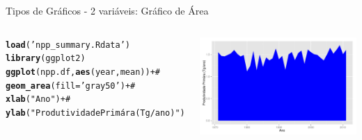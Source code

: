 \documentclass{beamer}\usepackage[]{graphicx}\usepackage[]{color}
\makeatletter
\newcommand{\hlstr}[1]{\textcolor[rgb]{0.192,0.494,0.8}{#1}}%
\newcommand{\hlcom}[1]{\textcolor[rgb]{0.678,0.584,0.686}{\textit{#1}}}%
\newcommand{\hlopt}[1]{\textcolor[rgb]{0,0,0}{#1}}%
\newcommand{\hlstd}[1]{\textcolor[rgb]{0.345,0.345,0.345}{#1}}%
\newcommand{\hlkwc}[1]{\textcolor[rgb]{0.333,0.667,0.333}{#1}}%
\newcommand{\hlkwd}[1]{\textcolor[rgb]{0.737,0.353,0.396}{\textbf{#1}}}%
\newenvironment{kframe}{%
 \def\at@end@of@kframe{}%
 \ifinner\ifhmode%
  \def\at@end@of@kframe{\end{minipage}}%
  \begin{minipage}{\columnwidth}%
 \fi\fi%
 \def\FrameCommand##1{\hskip\@totalleftmargin \hskip-\fboxsep
 \colorbox{shadecolor}{##1}\hskip-\fboxsep
     \hskip-\linewidth \hskip-\@totalleftmargin \hskip\columnwidth}%
 \MakeFramed {\advance\hsize-\width
   \@totalleftmargin\z@ \linewidth\hsize
   \@setminipage}}%
 {\par\unskip\endMakeFramed%
 \at@end@of@kframe}
\newenvironment{knitrout}{}{} %
\renewenvironment{knitrout}{\setlength{\topsep}{0mm}}{}
\makeatother
\begin{document}
\begin{frame}[fragile]{Tipos de Gráficos - 2 variáveis: Gráfico de Área}

\begin{columns}[t]


\begin{knitrout}\tiny
{}\color{fgcolor}\begin{kframe}
\begin{alltt}
\hlkwd{load}\hlstd{(}\hlstr{'npp_summary.Rdata'}\hlstd{)}
\hlkwd{library}\hlstd{(ggplot2)}
\hlkwd{ggplot}\hlstd{(npp.df,}\hlkwd{aes}\hlstd{(year,mean))} \hlopt{+}\hlcom{#}
  \hlkwd{geom_area}\hlstd{(}\hlkwc{fill}\hlstd{=}\hlstr{'gray50'}\hlstd{)} \hlopt{+}\hlcom{#}
  \hlkwd{xlab}\hlstd{(}\hlstr{"Ano"}\hlstd{)} \hlopt{+}\hlcom{#}
  \hlkwd{ylab}\hlstd{(}\hlstr{"Produtividade Primára (Tg/ano)"}\hlstd{)}
\end{alltt}
\end{kframe}
\end{knitrout}


\begin{knitrout}
\color{fgcolor}
\includegraphics[width=1\linewidth]{figure/unnamed-chunk-67-1} 

\end{knitrout}

\end{columns}

\end{frame}
\end{document}

